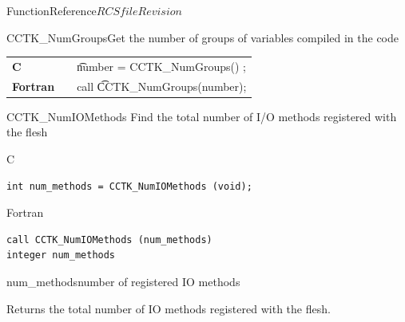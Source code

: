 \begin{cactuspart}{FunctionReference}{$RCSfile$}{$Revision$}
\begin{CCTKFunc}{CCTK\_NumGroups}{Get the number of groups of variables compiled in the code}
\label{CCTK-NumGroups}
\showargs
\begin{params}
\end{params}
\begin{discussion}
\end{discussion}
\begin{examples}
\begin{tabular}{@{}p{3cm}cp{11cm}}
\hfill {\bf C} && {\t number = CCTK\_NumGroups() };
\\
\hfill {\bf Fortran} && call {\t CCTK\_NumGroups(number)};
\\
\end{tabular}
\end{examples}
\begin{errorcodes}
\end{errorcodes}
\end{CCTKFunc}


\begin{FunctionDescription}{CCTK\_NumIOMethods}
\label{CCTK-NumIOMethods}
Find the total number of I/O methods registered with the flesh

\begin{SynopsisSection}
\begin{Synopsis}{C}
\begin{verbatim}
int num_methods = CCTK_NumIOMethods (void);
\end{verbatim}
\end{Synopsis}
\begin{Synopsis}{Fortran}
\begin{verbatim}
call CCTK_NumIOMethods (num_methods)
integer num_methods
\end{verbatim}
\end{Synopsis}
\end{SynopsisSection}

\begin{ParameterSection}
\begin{Parameter}{num\_methods}number of registered IO methods\end{Parameter}
\end{ParameterSection}

\begin{Discussion}
Returns the total number of IO methods registered with the flesh.
\end{Discussion}
\end{FunctionDescription}


\end{cactuspart}
